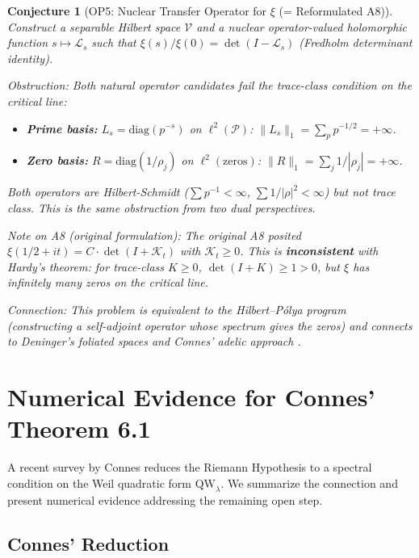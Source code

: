 \documentclass[12pt,a4paper]{article}
\newtheorem{conjecture}[theorem]{Conjecture}
\theoremstyle{definition}
\theoremstyle{remark}
\begin{document}
\begin{conjecture}[OP5: Nuclear Transfer Operator for $\xi$ (= Reformulated A8)]
\label{conj:A8prime}
Construct a separable Hilbert space $\mathcal{V}$ and a nuclear operator-valued holomorphic function $s \mapsto \mathcal{L}_s$ such that $\xi(s)/\xi(0) = \det(I - \mathcal{L}_s)$ (Fredholm determinant identity).

\emph{Obstruction:} Both natural operator candidates fail the trace-class condition on the critical line:
\begin{itemize}
  \item \textbf{Prime basis:} $L_s = \mathrm{diag}(p^{-s})$ on $\ell^2(\mathcal{P})$: $\|L_s\|_1 = \sum_p p^{-1/2} = +\infty$.
  \item \textbf{Zero basis:} $R = \mathrm{diag}(1/\rho_j)$ on $\ell^2(\mathrm{zeros})$: $\|R\|_1 = \sum_j 1/|\rho_j| = +\infty$.
\end{itemize}
Both operators are Hilbert-Schmidt ($\sum p^{-1} < \infty$, $\sum 1/|\rho|^2 < \infty$) but not trace class. This is the same obstruction from two dual perspectives.

\emph{Note on A8 (original formulation):} The original A8 posited $\xi(1/2+it) = C \cdot \det(I + \mathcal{K}_t)$ with $\mathcal{K}_t \geq 0$. This is \textbf{inconsistent} with Hardy's theorem: for trace-class $K \geq 0$, $\det(I+K) \geq 1 > 0$, but $\xi$ has infinitely many zeros on the critical line.

\emph{Connection:} This problem is equivalent to the Hilbert--P\'olya program (constructing a self-adjoint operator whose spectrum gives the zeros) and connects to Deninger's foliated spaces \cite{Deninger2002} and Connes' adelic approach \cite{Connes1999}.
\end{conjecture}


\section{Numerical Evidence for Connes' Theorem 6.1}
\label{sec:connes}

A recent survey by Connes \cite{Connes2025} reduces the Riemann Hypothesis to a spectral condition on the Weil quadratic form $\mathrm{QW}_\lambda$. We summarize the connection and present numerical evidence addressing the remaining open step.

\subsection{Connes' Reduction}
\end{document}
